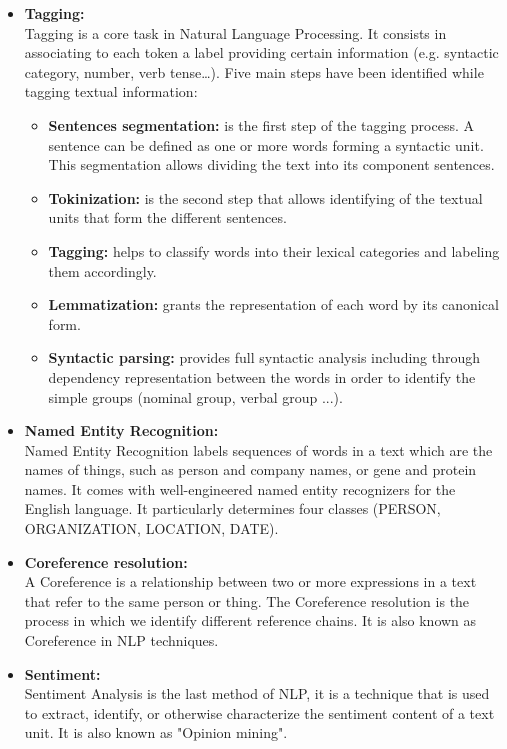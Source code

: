 \begin{itemize}
   \item \textbf{Tagging\cite{corenlp}:} \\
   Tagging is a core task in Natural Language Processing. It consists in associating to each token a label providing certain information (e.g. syntactic category, number, verb tense…). Five main steps have been identified while tagging textual information: 
   \begin{itemize}
     \item \textbf{Sentences segmentation:} is the first step of the tagging process. A sentence can be defined as one or more words forming a syntactic unit. This segmentation allows dividing the text into its component sentences. 
     \item \textbf{Tokinization:} is the second step that allows identifying of the textual units that form the different sentences.
     \item \textbf{Tagging:} helps to classify words into their lexical categories and labeling them accordingly.
     \item \textbf{Lemmatization:} grants the representation of each word by its canonical form.
     \item \textbf{Syntactic parsing:} provides full syntactic analysis including through dependency representation between the words in order to identify the simple groups (nominal group, verbal group ...). 
   \end{itemize}
   \item \textbf{Named Entity Recognition:} \\
   Named Entity Recognition \cite{ner} labels sequences of words in a text which are the names of things, such as person and company names, or gene and protein names. It comes with well-engineered named entity recognizers for the English language. It particularly determines four classes (PERSON, ORGANIZATION, LOCATION, DATE).
   
   \item \textbf{Coreference resolution:} \\
   A Coreference is a relationship between two or more expressions in a text that refer to the same person or thing. The Coreference resolution \cite{corenlp} is the process in which we identify different reference chains. It is also known as Coreference in NLP techniques.
   
   \item \textbf{Sentiment:} \\
  Sentiment Analysis is the last method of NLP, it is a technique that is used to extract, identify, or otherwise characterize the sentiment content of a text unit. It is also known as "Opinion mining".

\end{itemize}

